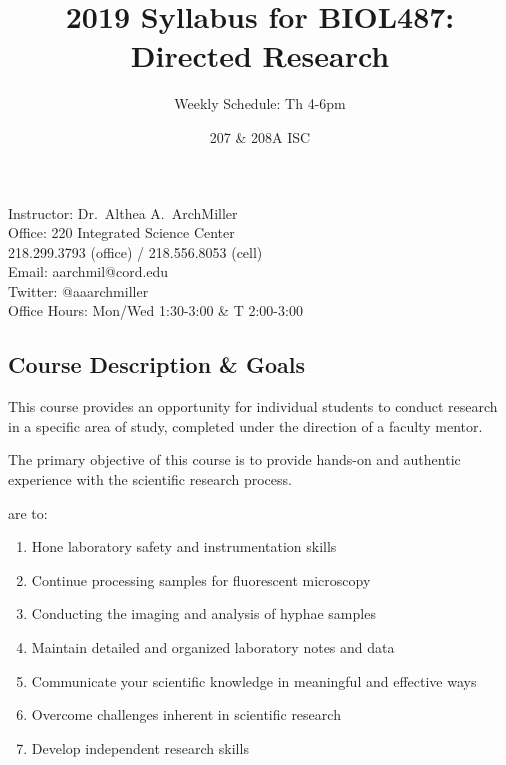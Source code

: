 \documentclass{tufte-handout}
\title{2019 Syllabus for BIOL487: Directed Research}										%
\author{Weekly Schedule: Th 4-6pm}										%
\date{207 \& 208A ISC}
\begin{document}
\maketitle

Instructor: Dr.~Althea A.~ArchMiller\\
Office: 220 Integrated Science Center\\
218.299.3793 (office) / 218.556.8053 (cell)\\
Email: aarchmil@cord.edu\\
Twitter: @aaarchmiller\\
Office Hours: Mon/Wed 1:30-3:00 \& T 2:00-3:00


\begin{fullwidth}

\section{Course Description \& Goals}

This course provides an opportunity for individual students to conduct research in a specific area of study, completed under the direction of a faculty mentor.%


The primary objective of this course is to provide hands-on and authentic experience with the scientific research process. 

 are to:

\begin{enumerate}
	\item Hone laboratory safety and instrumentation skills
	\item Continue processing samples for fluorescent microscopy
	\item Conducting the imaging and analysis of hyphae samples
	\item Maintain detailed and organized laboratory notes and data
	\item Communicate your scientific knowledge in meaningful and effective ways
	\item Overcome challenges inherent in scientific research
	\item Develop independent research skills
\end{enumerate}

\end{fullwidth}
\end{document}
